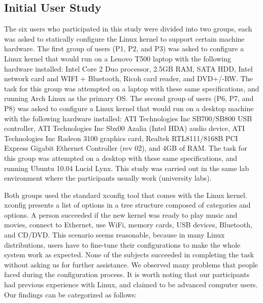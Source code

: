 \documentclass{chi2009}
\begin{document}
\subsection{Initial User Study}
The six users who participated in this study were divided into two groups, each was asked to statically configure the Linux kernel to support certain machine
hardware. The first group of users (P1, P2, and P3) was asked to configure a Linux kernel that would run on a Lenovo T500 laptop with the following hardware
installed: Intel Core 2 Duo processor, 2.5GB RAM, SATA HDD, Intel network card and WIFI + Bluetooth, Ricoh card reader, and DVD+/-RW. The task for this group
was attempted on a laptop with these same specifications, and running Arch Linux as the primary OS. The second group of users (P6, P7, and P8) was asked to
configure a Linux kernel that would run on a desktop machine with the following hardware installed: ATI Technologies Inc SB700/SB800 USB controller, ATI
Technologies Inc Sbx00 Azalia (Intel HDA) audio device, ATI Technologies Inc Radeon 3100 graphics card, Realtek RTL8111/8168B PCI Express Gigabit Ethernet
Controller (rev 02), and 4GB of RAM. The task for this group was attempted on a desktop with these same specifications, and running Ubuntu 10.04 Lucid Lynx.
This study was carried out in the same lab environment where the participants usually work (university labs).

Both groups used the standard \textsf{xconfig} tool that comes with the Linux kernel. \textsf{xconfig} presents a list of options in a tree structure composed
of categories and options. A person succeeded if the new kernel was ready to play music and movies, connect to Ethernet, use WiFi, memory cards, USB devices,
Bluetooth, and CD/DVD. This scenario seems reasonable, because in many Linux distributions, users have to fine-tune their configurations to make the whole
system work as expected. None of the subjects succeeded in completing the task without asking us for further assistance. We observed many problems that people
faced during the configuration process. It is worth noting that our participants had previous experience with Linux, and claimed to be advanced computer users.
Our findings can be categorized as follows:
\end{document}
